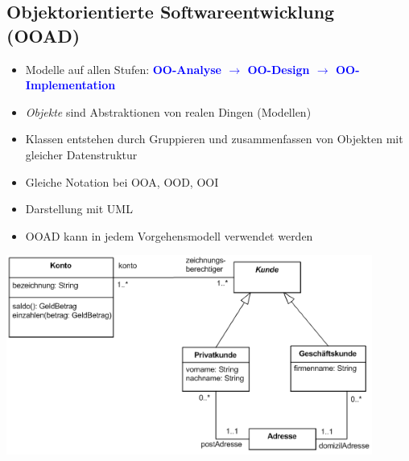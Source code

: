\subsection{Objektorientierte Softwareentwicklung (OOAD)}
\begin{minipage}[b]{13cm}
	\begin{itemize}
		\item Modelle auf allen Stufen:\textcolor{blue}{\textbf{ OO-Analyse $\rightarrow$ OO-Design $\rightarrow$ OO-Implementation}}
		\item \textit{Objekte} sind Abstraktionen von realen Dingen (Modellen)
		\item Klassen entstehen durch Gruppieren und zusammenfassen von Objekten mit gleicher Datenstruktur
		\item Gleiche Notation bei OOA, OOD, OOI
		\item Darstellung mit UML
		\item OOAD kann in jedem Vorgehensmodell verwendet werden
	\end{itemize}
	\vspace{1pt}
\end{minipage}
\newline
\includegraphics[width=12cm]{images/uml.png}

